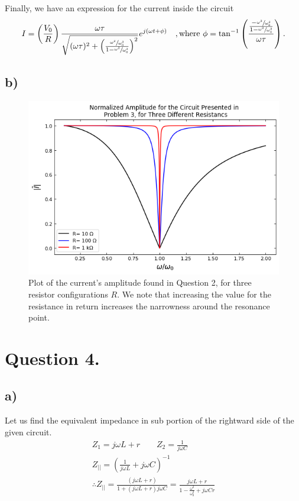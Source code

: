 \documentclass[
	12pt,
	]{article}
\theoremstyle{definition}
\theoremstyle{definition}
\theoremstyle{definition}
\theoremstyle{definition}
\theoremstyle{definition}
\theoremstyle{example}
\theoremstyle{note}
\theoremstyle{remark}
\theoremstyle{example}
\begin{document}
 				Finally, we have an expression for the current inside the circuit 
 				\begin{equation*}
 					I = \left(\frac{V_{0}}{R}\right)\frac{\omega\tau}{\sqrt{(\omega\tau)^{2} + \left(\frac{\sfrac{\omega^{2}}{\omega_{0}^{2}}}{1-\sfrac{\omega^{2}}{\omega_{0}^{2}}}\right)^{2}}} e^{j(\omega t + \phi)}\quad, \text{where } \phi = \tan^{-1}\left(\frac{\frac{-\sfrac{\omega^{2}}{\omega_{0}^{2}}}{1-\sfrac{\omega^{2}}{\omega_{0}^{2}}}}{\omega\tau}\right).
 				\end{equation*}
 			\subsection*{b) }
 				\begin{figure}[h]
 					\centering
 					\includegraphics[width=0.8\linewidth]{PHYS241_Ass4_Figure1.png}
 					\caption{Plot of the current's amplitude found in Question 2, for three resistor configurations $R$. We note that increasing the value for the resistance in return increases the narrowness around the resonance point.}
 				\end{figure}
 		\section*{Question 4.}
 			\subsection*{a) }
 				Let us find the equivalent impedance in sub portion of the rightward side of the given circuit.
 				\begin{gather*}
 					Z_1 = j\omega L + r \qquad Z_{2} = \frac{1}{j\omega C} \\
 					Z_{||} =\left(\frac{1}{j\omega L} + j\omega C\right)^{-1} \\
 					\therefore Z_{||}= \frac{(j\omega L + r)}{1+ (j\omega L +r)j\omega C} = \frac{j\omega L +r }{1- \frac{\omega^{2}}{\omega_{0}^{2}} + j\omega C r}
 				\end{gather*}
\end{document}
